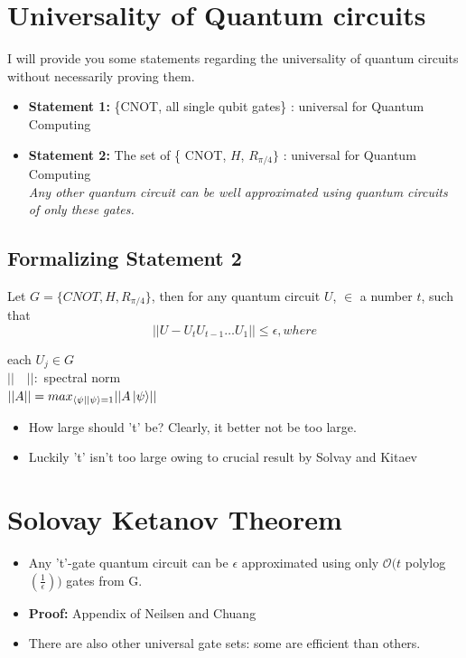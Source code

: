 \documentclass[11.5pt, paper=a4]{article}
\theoremstyle{definition}
\numberwithin{theorem}{section}
\begin{document}
\section{Universality of Quantum circuits}

I will provide you some statements regarding the universality of quantum circuits without necessarily proving them.
\begin{itemize}
    \item \textbf{Statement 1:} \{CNOT, all single qubit gates\} : universal for Quantum Computing
    \item \textbf{Statement 2:} The set of \{ CNOT, $H$, $R_{\pi/4}\}$ : universal for Quantum Computing \\
    \textit{Any other quantum circuit can be well approximated using quantum circuits of only these gates.}
\end{itemize}
\subsection{Formalizing Statement 2}
    Let $G=\{CNOT, H, R_{\pi/4}\}$, then for any quantum circuit $U$, $\in$ a number $t$, such that
    \begin{equation*}
        \lvert\lvert U - U_t U_{t-1} \ldots U_1 \rvert\rvert \leq \epsilon, where
    \end{equation*}
    \begin{center}
        each $U_j \in G$ \\ $\lvert \lvert \quad \rvert \rvert:$ spectral norm \\ $\lvert \lvert A \rvert \rvert = max_{\left\langle{\psi}\right\vert\left\vert{\psi}\right\rangle=1} \lvert \lvert A\left\vert{\psi}\right\rangle \rvert \rvert$
    \end{center}
    \begin{itemize}
        \item How large should 't' be? Clearly, it better not be too large.
        \item Luckily 't' isn't too large owing to crucial result by Solvay and Kitaev
    \end{itemize}
\section{Solovay Ketanov Theorem}
\begin{itemize}
    \item Any 't'-gate quantum circuit can be $\epsilon$ approximated using only $\mathcal{O}(t$ polylog$ (\frac{1}{\epsilon}))$ gates from G.
    \item \textbf{Proof:} Appendix of Neilsen and Chuang \cite{nielsen2002quantum}
    \item There are also other universal gate sets: some are efficient than others.
\end{itemize}
\end{document}
